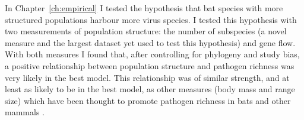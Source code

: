





In Chapter~\ref{ch:empirical} I tested the hypothesis that bat species with more structured populations harbour more virus species.
I tested this hypothesis with two measurements of population structure: the number of subspecies (a novel measure and the largest dataset yet used to test this hypothesis) and gene flow.
With both measures I found that, after controlling for phylogeny and study bias, a positive relationship between population structure and pathogen richness was very likely in the best model.
This relationship was of similar strength, and at least as likely to be in the best model, as other measures (body mass and range size) which have been thought to promote pathogen richness in bats and other mammals \cite{kamiya2014determines, arneberg2002host, gay2014parasite, nunn2003comparative, turmelle2009correlates}.




